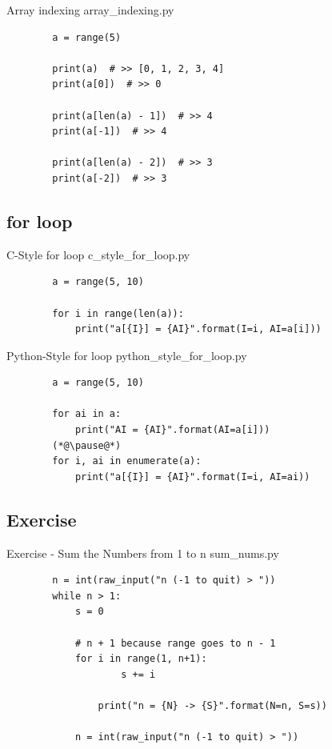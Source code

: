 \documentclass[11pt]{beamer}
\begin{document}
\begin{frame}[fragile]{Array indexing}
	array\_indexing.py
	\begin{lstlisting}
		a = range(5)
		
		print(a)  # >> [0, 1, 2, 3, 4]
		print(a[0])  # >> 0
		
		print(a[len(a) - 1])  # >> 4
		print(a[-1])  # >> 4
		
		print(a[len(a) - 2])  # >> 3
		print(a[-2])  # >> 3
	\end{lstlisting}
\end{frame}

\subsection{for loop}
\begin{frame}[fragile]{C-Style for loop}
	c\_style\_for\_loop.py
	\begin{lstlisting}
		a = range(5, 10)
		
		for i in range(len(a)):
		    print("a[{I}] = {AI}".format(I=i, AI=a[i]))
	\end{lstlisting}
\end{frame}

\begin{frame}[fragile]{Python-Style for loop}
	python\_style\_for\_loop.py
	\begin{lstlisting}
		a = range(5, 10)
		
		for ai in a:
		    print("AI = {AI}".format(AI=a[i])) 
		(*@\pause@*)
		for i, ai in enumerate(a):
		    print("a[{I}] = {AI}".format(I=i, AI=ai))
	\end{lstlisting}
\end{frame}

\subsection{Exercise}
\begin{frame}[fragile]{Exercise - Sum the Numbers from 1 to n}
	sum\_nums.py	
	\pause
	\begin{lstlisting}
		n = int(raw_input("n (-1 to quit) > "))
		while n > 1:
		    s = 0		 
		    
		    # n + 1 because range goes to n - 1   
		    for i in range(1, n+1):
		    	    s += i
		    	
		    	print("n = {N} -> {S}".format(N=n, S=s))
		    
		    n = int(raw_input("n (-1 to quit) > "))
	\end{lstlisting}
\end{frame}
\end{document}
